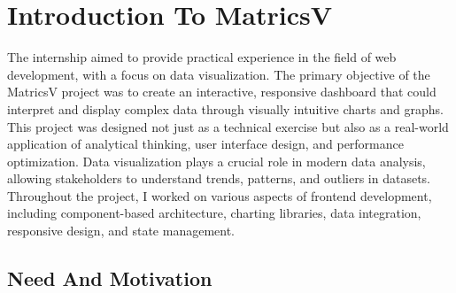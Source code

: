  



      



\newpage
\section{Introduction To MatricsV }

The internship aimed to provide practical experience in the field of web development, with a focus on data visualization. The primary objective of the MatricsV project was to create an interactive, responsive dashboard that could interpret and display complex data through visually intuitive charts and graphs. This project was designed not just as a technical exercise but also as a real-world application of analytical thinking, user interface design, and performance optimization. Data visualization plays a crucial role in modern data analysis, allowing stakeholders to understand trends, patterns, and outliers in datasets. Throughout the project, I worked on various aspects of frontend development, including component-based architecture, charting libraries, data integration, responsive design, and state management. 

\subsection{Need And Motivation}


